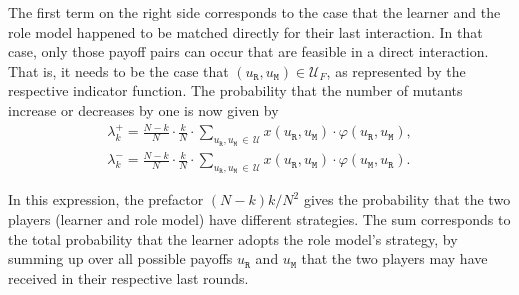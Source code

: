 \documentclass[11pt]{article}
\def\resident{\texttt{R}}
\def\mutant{\texttt{M}}
\theoremstyle{plainCl1}
\theoremstyle{plainCl2}
\begin{document}

\noindent
The first term on the right side corresponds to the case that the learner and
the role model happened to be matched directly for their last interaction. 
In that case, only those payoff pairs can occur that are feasible in a direct interaction. 
That is, it needs to be the case that $(u_\resident,u_\mutant)\in \mathcal{U}_F$, as represented by the respective indicator function. 
The probability that the number of mutants increase or decreases by one is now given by
\begin{equation}
\begin{array}{l}
\displaystyle \lambda^+_k=\frac{N\!-\!k}{N}\cdot \frac{k}{N}\cdot \sum_{u_\resident,u_\mutant\,\in\,\mathcal{U}} x(u_\resident,u_\mutant)\cdot \varphi(u_\resident,u_\mutant), \\[0.5cm]
\displaystyle \lambda^-_k=\frac{N\!-\!k}{N}\cdot \frac{k}{N}\cdot \sum_{u_\resident,u_\mutant \,\in\, \mathcal{U}} x(u_\resident,u_\mutant)\cdot \varphi(u_\mutant,u_\resident).
\end{array}
\end{equation}

\noindent
In this expression, the prefactor $(N\!-\!k)k/N^2$ gives the probability that the two players (learner and role model) have different strategies. 
The sum corresponds to the total probability that the learner
adopts the role model's strategy, by summing up over all possible payoffs $u_\resident$ and $u_\mutant$ that
the two players may have received in their respective last rounds. 

\end{document}
